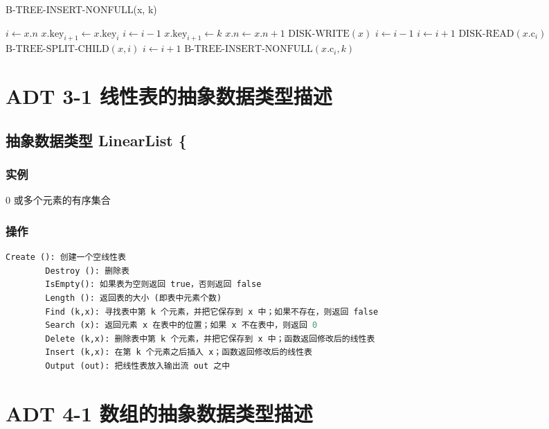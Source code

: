 \documentclass[UTF8]{ctexart}
\begin{document}
\begin{algorithm}
\caption{B-TREE-INSERT-NONFULL(x, k)}
\label{alg:btree_insert_nonfull}
\begin{algorithmic}[1]
\STATE $ i \gets x.n $
\STATE $ x.\text{key}_{i + 1} \gets x.\text{key}_i $
\STATE $ i \gets i - 1 $
\ENDWHILE
\STATE $ x.\text{key}_{i + 1} \gets k $
\STATE $ x.n \gets x.n + 1 $
\STATE $\text{DISK-WRITE}(x)$
\STATE $ i \gets i - 1 $
\STATE $ i \gets i + 1 $
\STATE $\text{DISK-READ}(x.\text{c}_i)$
\STATE $\text{B-TREE-SPLIT-CHILD}(x, i)$
\STATE $ i \gets i + 1 $
\ENDIF
\ENDIF
\STATE $\text{B-TREE-INSERT-NONFULL}(x.\text{c}_i, k)$
\ENDIF
\end{algorithmic}
\end{algorithm}
	
		
	\section*{ADT 3-1 线性表的抽象数据类型描述}
	
	\subsection*{抽象数据类型 LinearList \{}
	
	\subsubsection*{实例}
	0 或多个元素的有序集合
	
	\subsubsection*{操作}
	\begin{lstlisting}[language=Python, caption={LinearList ADT}]
		Create (): 创建一个空线性表
		Destroy (): 删除表
		IsEmpty(): 如果表为空则返回 true，否则返回 false
		Length (): 返回表的大小 (即表中元素个数)
		Find (k,x): 寻找表中第 k 个元素，并把它保存到 x 中；如果不存在，则返回 false
		Search (x): 返回元素 x 在表中的位置；如果 x 不在表中，则返回 0
		Delete (k,x): 删除表中第 k 个元素，并把它保存到 x 中；函数返回修改后的线性表
		Insert (k,x): 在第 k 个元素之后插入 x；函数返回修改后的线性表
		Output (out): 把线性表放入输出流 out 之中
	\end{lstlisting}
	
	\section*{ADT 4-1 数组的抽象数据类型描述}
	
\end{document}
